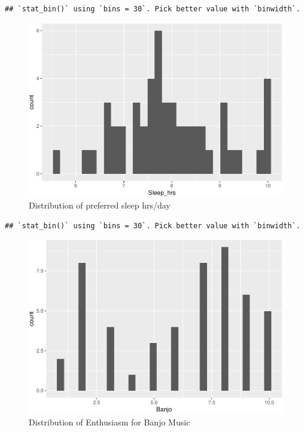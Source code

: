 \documentclass[]{article}
\newenvironment{Shaded}{\begin{snugshade}}{\end{snugshade}}
\newcommand{\KeywordTok}[1]{\textcolor[rgb]{0.13,0.29,0.53}{\textbf{#1}}}
\newcommand{\DataTypeTok}[1]{\textcolor[rgb]{0.13,0.29,0.53}{#1}}
\newcommand{\StringTok}[1]{\textcolor[rgb]{0.31,0.60,0.02}{#1}}
\newcommand{\OperatorTok}[1]{\textcolor[rgb]{0.81,0.36,0.00}{\textbf{#1}}}
\newcommand{\NormalTok}[1]{#1}
\begin{document}
\begin{verbatim}
## `stat_bin()` using `bins = 30`. Pick better value with `binwidth`.
\end{verbatim}

\begin{figure}
\centering
\includegraphics{bootcamp-survey_files/figure-latex/Sleep_hrs_hist-1.pdf}
\caption{Distribution of preferred sleep hrs/day}
\end{figure}

\begin{Shaded}
\end{Shaded}

\begin{verbatim}
## `stat_bin()` using `bins = 30`. Pick better value with `binwidth`.
\end{verbatim}

\begin{figure}
\centering
\includegraphics{bootcamp-survey_files/figure-latex/unnamed-chunk-5-1.pdf}
\caption{Distribution of Enthusiasm for Banjo Music}
\end{figure}
\end{document}

